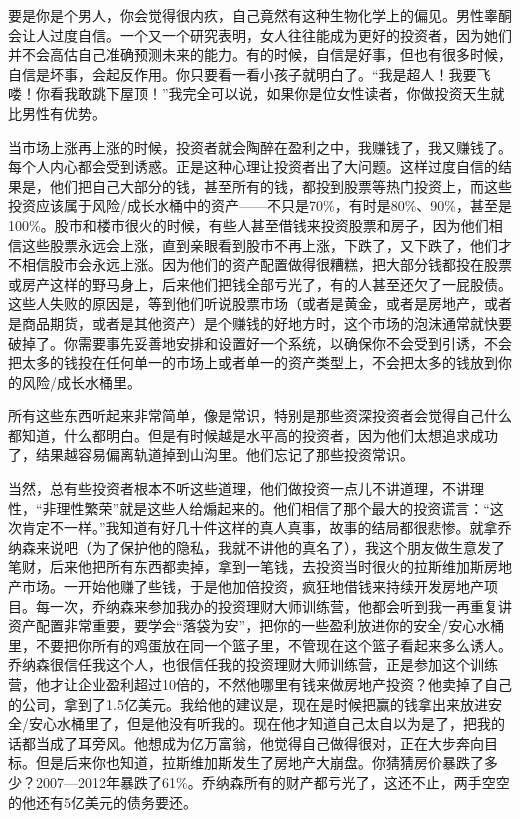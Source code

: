 要是你是个男人，你会觉得很内疚，自己竟然有这种生物化学上的偏见。男性睾酮会让人过度自信。一个又一个研究表明，女人往往能成为更好的投资者，因为她们并不会高估自己准确预测未来的能力。有的时候，自信是好事，但也有很多时候，自信是坏事，会起反作用。你只要看一看小孩子就明白了。“我是超人！我要飞喽！你看我敢跳下屋顶！”我完全可以说，如果你是位女性读者，你做投资天生就比男性有优势。

当市场上涨再上涨的时候，投资者就会陶醉在盈利之中，我赚钱了，我又赚钱了。每个人内心都会受到诱惑。正是这种心理让投资者出了大问题。这样过度自信的结果是，他们把自己大部分的钱，甚至所有的钱，都投到股票等热门投资上，而这些投资应该属于风险/成长水桶中的资产——不只是70\%，有时是80\%、90\%，甚至是100\%。股市和楼市很火的时候，有些人甚至借钱来投资股票和房子，因为他们相信这些股票永远会上涨，直到亲眼看到股市不再上涨，下跌了，又下跌了，他们才不相信股市会永远上涨。因为他们的资产配置做得很糟糕，把大部分钱都投在股票或房产这样的野马身上，后来他们把钱全部亏光了，有的人甚至还欠了一屁股债。这些人失败的原因是，等到他们听说股票市场（或者是黄金，或者是房地产，或者是商品期货，或者是其他资产）是个赚钱的好地方时，这个市场的泡沫通常就快要破掉了。你需要事先妥善地安排和设置好一个系统，以确保你不会受到引诱，不会把太多的钱投在任何单一的市场上或者单一的资产类型上，不会把太多的钱放到你的风险/成长水桶里。

所有这些东西听起来非常简单，像是常识，特别是那些资深投资者会觉得自己什么都知道，什么都明白。但是有时候越是水平高的投资者，因为他们太想追求成功了，结果越容易偏离轨道掉到山沟里。他们忘记了那些投资常识。

当然，总有些投资者根本不听这些道理，他们做投资一点儿不讲道理，不讲理性，“非理性繁荣”就是这些人给煽起来的。他们相信了那个最大的投资谎言：“这次肯定不一样。”我知道有好几十件这样的真人真事，故事的结局都很悲惨。就拿乔纳森来说吧（为了保护他的隐私，我就不讲他的真名了），我这个朋友做生意发了笔财，后来他把所有东西都卖掉，拿到一笔钱，去投资当时很火的拉斯维加斯房地产市场。一开始他赚了些钱，于是他加倍投资，疯狂地借钱来持续开发房地产项目。每一次，乔纳森来参加我办的投资理财大师训练营，他都会听到我一再重复讲资产配置非常重要，要学会“落袋为安”，把你的一些盈利放进你的安全/安心水桶里，不要把你所有的鸡蛋放在同一个篮子里，不管现在这个篮子看起来多么诱人。乔纳森很信任我这个人，也很信任我的投资理财大师训练营，正是参加这个训练营，他才让企业盈利超过10倍的，不然他哪里有钱来做房地产投资？他卖掉了自己的公司，拿到了1.5亿美元。我给他的建议是，现在是时候把赢的钱拿出来放进安全/安心水桶里了，但是他没有听我的。现在他才知道自己太自以为是了，把我的话都当成了耳旁风。他想成为亿万富翁，他觉得自己做得很对，正在大步奔向目标。但是后来你也知道，拉斯维加斯发生了房地产大崩盘。你猜猜房价暴跌了多少？2007—2012年暴跌了61\%。乔纳森所有的财产都亏光了，这还不止，两手空空的他还有5亿美元的债务要还。

